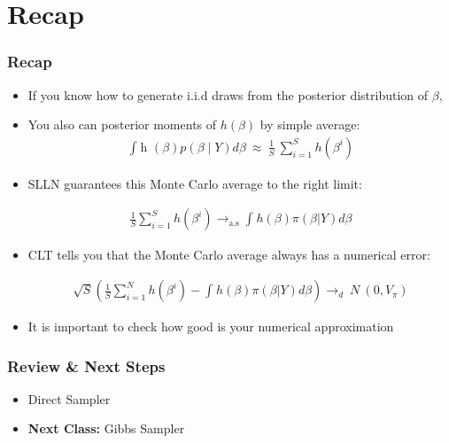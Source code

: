 \documentclass[
  shownotes,
  xcolor={svgnames},
  hyperref={colorlinks,citecolor=DarkBlue,linkcolor=DarkRed,urlcolor=DarkBlue}
  , aspectratio=169]{beamer}
\begin{document}
\section{Recap}
\begin{frame}[fragile]
\frametitle{Recap} 

\begin{itemize}
\item If you know how to generate $\text{i.i.d}$ draws from the posterior distribution of $\beta$,

\item You also can posterior moments of $h(\beta)$ by simple average:
\begin{align}
\int_{}^{}{\text{h\ }\left( \beta \right)p\left( \beta \middle| Y \right)d\beta}\  \approx \ \frac{1}{S}\ \sum_{i = 1}^{S}{h (\beta^{i})}
\end{align}
\item  SLLN guarantees this Monte Carlo average to the right limit:

\begin{align}
\frac{1}{S} \sum_{i = 1}^{S}{h\left( \beta^{i} \right) \rightarrow_{\text{a.s}} \int_{}^{} h\left( \beta \right)\pi\left( \beta | Y \right)d\beta }
\end{align}

\item CLT tells you that the Monte Carlo average always has a numerical error:

\begin{align}
\sqrt{S} \left( \frac{1}{S} \sum_{i = 1}^{N} h \left( \beta^{i} \right) - \int_{}^{}{h\left( \beta \right)\pi\left( \beta| Y \right)d\beta } \right)  \rightarrow_{d}\ N\ (0,V_{\pi}) 
\end{align}
\item  It is important to check how good is your numerical approximation
\end{itemize}
\end{frame}


\begin{frame}
\frametitle{Review \& Next Steps}
  
  \begin{itemize} 
    
    
    \item Direct Sampler
  \bigskip  

  
  \item  {\bf Next Class:} Gibbs Sampler

  
  
  \end{itemize}


\end{frame}
\end{document}

